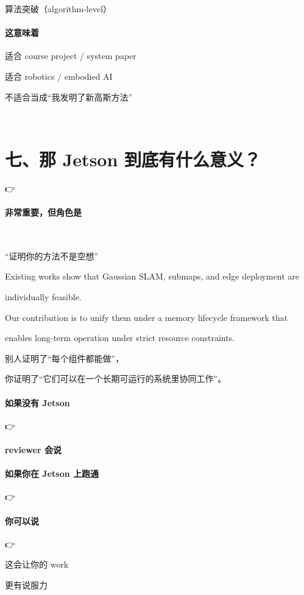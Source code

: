 \documentclass[12pt]{article}
\begin{document}
算法突破（algorithm-level）

\paragraph{这意味着}
适合 course project / system paper

适合 robotics / embodied AI

不适合当成“我发明了新高斯方法”

🧭

\section{七、那 Jetson 到底有什么意义？}
👉

\paragraph{非常重要，但角色是}
🎯

“证明你的方法不是空想”

Existing works show that Gaussian SLAM, submaps, and edge deployment are

individually feasible.

Our contribution is to unify them under a memory lifecycle framework that

enables long-term operation under strict resource constraints.

别人证明了“每个组件都能做”，

你证明了“它们可以在一个长期可运行的系统里协同工作”。

\paragraph{如果没有 Jetson}
👉

\paragraph{reviewer 会说}
\paragraph{如果你在 Jetson 上跑通}
👉

\paragraph{你可以说}
👉

这会让你的 work

更有说服力
\end{document}
